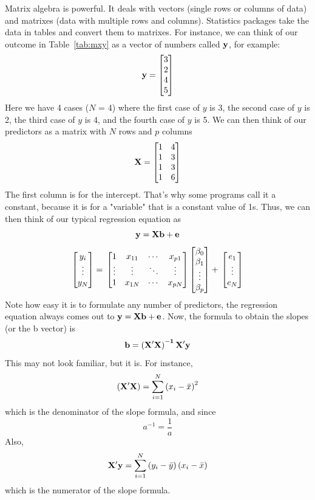 Matrix algebra is powerful. It deals with vectors (single rows or columns of data) and matrixes (data with multiple rows and columns). Statistics packages take the data in tables and convert them to matrixes. For instance, we can think of our outcome in Table~\ref{tab:mxy} as a vector of numbers called ${\bf{y}}$, for example:
\[
{\bf{y}}=
\begin{bmatrix}
3 \\
2 \\
4 \\
5 \\
\end{bmatrix}
\]
Here we have 4 cases ($N$ = 4) where the first case of $y$ is 3, the second case of $y$ is 2, the third case of $y$ is 4, and the fourth case of $y$ is 5. We can then think of our predictors as a matrix with $N$ rows and $p$ columns
\[
{\bf{X}}=
\begin{bmatrix}
1&4 \\
1&3 \\
1&3 \\
1&6 \\
\end{bmatrix}
\]
The first column is for the intercept. That's why some programs call it a constant, because it is for a "variable" that is a constant value of 1s. Thus, we can then think of our typical regression equation as
\begin{equation}\label{eq:matrixolsmodel}
{\bf{y=Xb+e}}
\end{equation}
\[
\begin{bmatrix}
y_i \\
\vdots \\
y_N \\
\end{bmatrix}
= \\
\begin{bmatrix}
1&x_{11}&\cdots&x_{p1} \\
\vdots&\vdots&\ddots&\vdots \\
1&x_{1N}&\cdots&x_{pN} \\
\end{bmatrix}
\begin{bmatrix}
\beta_0 \\
\beta_1 \\
\vdots \\
\beta_p \\
\end{bmatrix}
+ \\
\begin{bmatrix}
e_1 \\
\vdots \\
e_N \\
\end{bmatrix}
\]
Note how easy it is to formulate any number of predictors, the regression equation always comes out to ${\bf{y=Xb+e}}$. Now, the formula to obtain the slopes (or the b vector) is
\[
{\bf{b=\left(X'X\right)^{-1}X'y}}
\]
This may not look familiar, but it is. For instance,
\[
{\bf{\left(X'X\right)}}=\sum_{i=1}^N\left(x_i-\bar{x}\right)^2
\]
which is the denominator of the slope formula, and since
\[
a^{-1} = \frac{1}{a}
\]
Also,
\[
{\bf{X'y}} =\sum_{i=1}^N\left(y_i-\bar{y}\right)\left(x_i-\bar{x}\right)
\]
which is the numerator of the slope formula.

